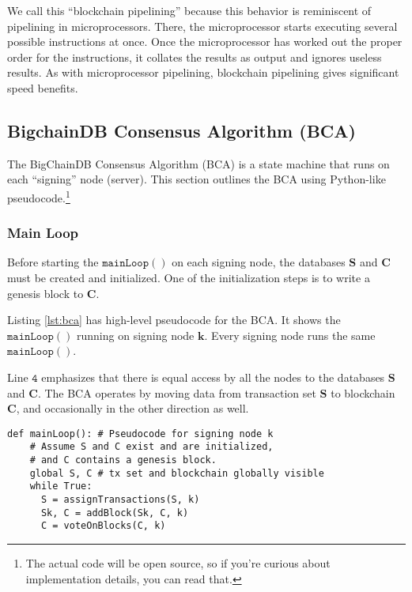 We call this “blockchain pipelining” because this behavior is reminiscent of pipelining in microprocessors.
There, the microprocessor starts executing several possible instructions at once.
Once the microprocessor has worked out the proper order for the instructions, it collates the results as output and ignores useless results.
As with microprocessor pipelining, blockchain pipelining gives significant speed benefits.

\subsection{BigchainDB Consensus Algorithm (BCA)}

The BigChainDB Consensus Algorithm (BCA) is a state machine that runs on each “signing” node (server).
This section outlines the BCA using Python-like pseudocode.\footnote{The actual code will be open source, so if you’re curious about implementation details, you can read that.}

\subsubsection{Main Loop}

Before starting the $\mathtt{mainLoop()}$ on each signing node, the databases $\mathbf{S}$ and $\mathbf{C}$ must be created and initialized.
One of the initialization steps is to write a genesis block to $\mathbf{C}$.

Listing \ref{lst:bca} has high-level pseudocode for the BCA.
It shows the $\mathtt{mainLoop()}$ running on signing node $\mathbf{k}$.
Every signing node runs the same $\mathtt{mainLoop()}$.

Line $\mathtt{4}$ emphasizes that there is equal access by all the nodes to the databases $\mathbf{S}$ and $\mathbf{C}$. 
The BCA operates by moving data from transaction set $\mathbf{S}$ to blockchain $\mathbf{C}$, and occasionally in the other direction as well.

\begin{minipage}{\linewidth}
  \begin{lstlisting}[caption={BigchainDB Consensus Algorithm. This algorithm runs on every signing node.}, label={lst:bca}, style=python]
  def mainLoop(): # Pseudocode for signing node k 
    # Assume S and C exist and are initialized,
    # and C contains a genesis block. 
    global S, C # tx set and blockchain globally visible
    while True: 
      S = assignTransactions(S, k) 
      Sk, C = addBlock(Sk, C, k) 
      C = voteOnBlocks(C, k)
  \end{lstlisting}
\end{minipage}

